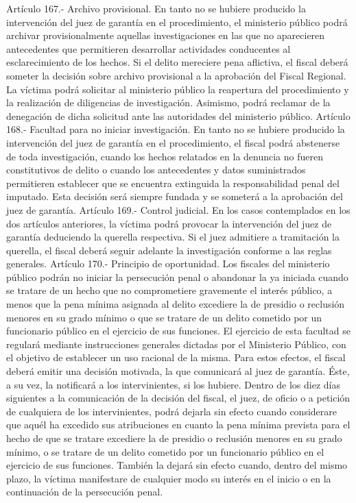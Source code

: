     Artículo 167.- Archivo provisional. En tanto no se hubiere producido la intervención del juez de garantía en el procedimiento, el ministerio público podrá archivar provisionalmente aquellas investigaciones en las que no aparecieren antecedentes que permitieren desarrollar actividades conducentes al esclarecimiento de los hechos.
    Si el delito mereciere pena aflictiva, el fiscal deberá someter la decisión sobre archivo provisional a la aprobación del Fiscal Regional.
    La víctima podrá solicitar al ministerio público la reapertura del procedimiento y la realización de diligencias de investigación. Asimismo, podrá reclamar de la denegación de dicha solicitud ante las autoridades del ministerio público.
    Artículo 168.- Facultad para no iniciar investigación. En tanto no se hubiere producido la intervención del juez de garantía en el procedimiento, el fiscal podrá abstenerse de toda investigación, cuando los hechos relatados en la denuncia no fueren constitutivos de delito o cuando los antecedentes y datos suministrados permitieren establecer que se encuentra extinguida la responsabilidad penal del imputado. Esta decisión será siempre fundada y se someterá a la aprobación del juez de garantía.
    Artículo 169.- Control judicial. En los casos contemplados en los dos artículos anteriores, la víctima podrá provocar la intervención del juez de garantía deduciendo la querella respectiva.
    Si el juez admitiere a tramitación la querella, el fiscal deberá seguir adelante la investigación conforme a las reglas generales.
    Artículo 170.- Principio de oportunidad. Los fiscales del ministerio público podrán no iniciar la persecución penal o abandonar la ya iniciada cuando se tratare de un hecho que no comprometiere gravemente el interés público, a menos que la pena mínima asignada al delito excediere la de presidio o reclusión menores en su grado mínimo o que se tratare de un delito cometido por un funcionario público en el ejercicio de sus funciones.
    El ejercicio de esta facultad se regulará mediante instrucciones generales dictadas por el Ministerio Público, con el objetivo de establecer un uso racional de la misma.
    Para estos efectos, el fiscal deberá emitir una decisión motivada, la que comunicará al juez de garantía. Éste, a su vez, la notificará a los intervinientes, si los hubiere.
    Dentro de los diez días siguientes a la comunicación de la decisión del fiscal, el juez, de oficio o a petición de cualquiera de los intervinientes, podrá dejarla sin efecto cuando considerare que aquél ha excedido sus atribuciones en cuanto la pena mínima prevista para el hecho de que se tratare excediere la de presidio o reclusión menores en su grado mínimo, o se tratare de un delito cometido por un funcionario público en el ejercicio de sus funciones. También la dejará sin efecto cuando, dentro del mismo plazo, la víctima manifestare de cualquier modo su interés en el inicio o en la continuación de la persecución penal.
